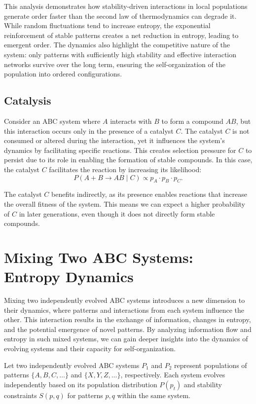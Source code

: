\documentclass[entropy,article,submit,pdftex,moreauthors]{Definitions/mdpi}
\begin{document}
This analysis demonstrates how stability-driven interactions in local populations generate order faster than the second law of thermodynamics can degrade it. While random fluctuations tend to increase entropy, the exponential reinforcement of stable patterns creates a net reduction in entropy, leading to emergent order. The dynamics also highlight the competitive nature of the system: only patterns with sufficiently high stability and effective interaction networks survive over the long term, ensuring the self-organization of the population into ordered configurations.

\subsection{Catalysis}

Consider an ABC system where \( A \) interacts with \( B \) to form a compound \( AB \), but this interaction occurs only in the presence of a catalyst \( C \). The catalyst \( C \) is not consumed or altered during the interaction, yet it influences the system's dynamics by facilitating specific reactions. This creates selection pressure for \( C \) to persist due to its role in enabling the formation of stable compounds. In this case, the catalyst \( C \) facilitates the reaction by increasing its likelihood:
\[
P(A + B \to AB \mid C) \propto p_A \cdot p_B \cdot p_C.
\]

The catalyst \( C \) benefits indirectly, as its presence enables reactions that increase the overall fitness of the system. This means we can expect a higher probability of \( C \) in later generations, even though it does not directly form stable compounds.

\section{Mixing Two ABC Systems: Entropy Dynamics}

Mixing two independently evolved ABC systems introduces a new dimension to their dynamics, where patterns and interactions from each system influence the other. This interaction results in the exchange of information, changes in entropy, and the potential emergence of novel patterns. By analyzing information flow and entropy in such mixed systems, we can gain deeper insights into the dynamics of evolving systems and their capacity for self-organization.

Let two independently evolved ABC systems \( P_1 \) and \( P_2 \) represent populations of patterns \( \{A, B, C, \dots\} \) and \( \{X, Y, Z, \dots\} \), respectively. Each system evolves independently based on its population distribution \( P(p_t) \) and stability constraints \( S(p, q) \) for patterns \( p, q \) within the same system.
\end{document}
